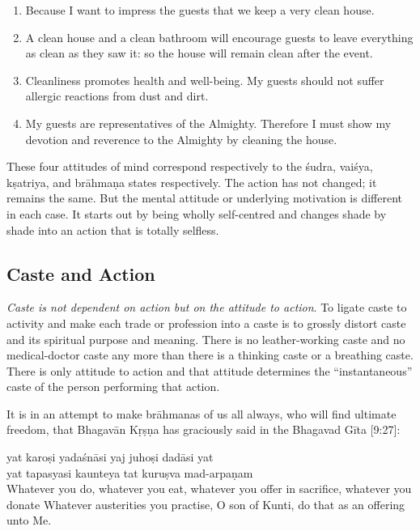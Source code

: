 \documentclass[
  a4paper,
]{article}
\begin{document}
\begin{enumerate}
\item
  Because I want to impress the guests that we keep a very clean house.
\item
  A clean house and a clean bathroom will encourage guests to leave
  everything as clean as they saw it: so the house will remain clean
  after the event.
\item
  Cleanliness promotes health and well-being. My guests should not
  suffer allergic reactions from dust and dirt.
\item
  My guests are representatives of the Almighty. Therefore I must show
  my devotion and reverence to the Almighty by cleaning the house.
\end{enumerate}

These four attitudes of mind correspond respectively to the śudra,
vaiśya, kṣatriya, and brāhmaṇa states respectively. The action has not
changed; it remains the same. But the mental attitude or underlying
motivation is different in each case. It starts out by being wholly
self-centred and changes shade by shade into an action that is totally
selfless.

\subsection{Caste and Action}\label{caste-and-action}

\emph{Caste is not dependent on action but on the attitude to action}.
To ligate caste to activity and make each trade or profession into a
caste is to grossly distort caste and its spiritual purpose and meaning.
There is no leather-working caste and no medical-doctor caste any more
than there is a thinking caste or a breathing caste. There is only
attitude to action and that attitude determines the ``instantaneous''
caste of the person performing that action.

It is in an attempt to make brāhmanas of us all always, who will find
ultimate freedom, that Bhagavān Kṛṣṇa has graciously said in the
Bhagavad Gīta {[}9:27{]}:

yat karoṣi yadaśnāsi yaj juhoṣi dadāsi yat\\
yat tapasyasi kaunteya tat kuruṣva mad-arpaṇam\\

Whatever you do, whatever you eat, whatever you offer in sacrifice,
whatever you donate Whatever austerities you practise, O son of Kunti,
do that as an offering unto Me.
\end{document}
